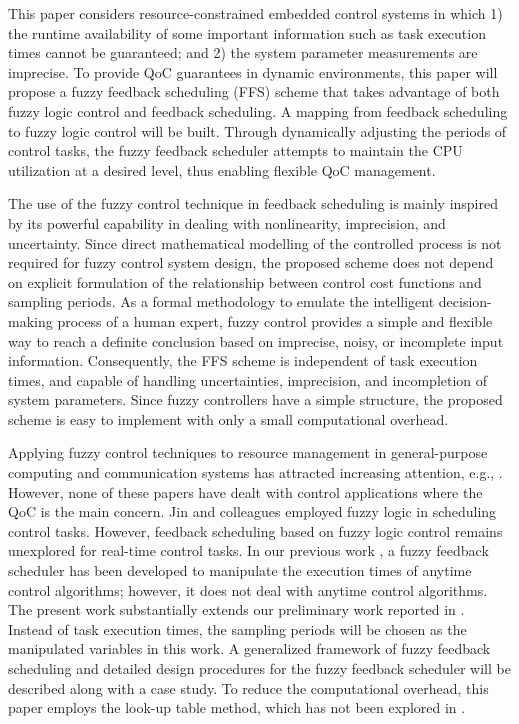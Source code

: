 \documentclass[12pt,a4paper]{ijicic}
\begin{document}
This paper considers resource-constrained embedded control systems
in which 1) the runtime availability of some important information
such as task execution times cannot be guaranteed; and 2) the system
parameter measurements are imprecise. To provide QoC guarantees in
dynamic environments, this paper will propose a fuzzy feedback
scheduling (FFS) scheme that takes advantage of both fuzzy logic
control \cite{R16,R17,R18,R19} and feedback scheduling. A mapping from
feedback scheduling to fuzzy logic control will be built. Through
dynamically adjusting the periods of control tasks, the fuzzy
feedback scheduler attempts to maintain the CPU utilization at a
desired level, thus enabling flexible QoC management.

The use of the fuzzy control technique in feedback scheduling is
mainly inspired by its powerful capability in dealing with
nonlinearity, imprecision, and uncertainty. Since direct mathematical modelling of the
controlled process is not required for fuzzy control system design,
the proposed scheme does not depend on explicit formulation of the
relationship between control cost functions and sampling periods. As
a formal methodology to emulate the intelligent decision-making
process of a human expert, fuzzy control provides a simple and
flexible way to reach a definite conclusion based on imprecise,
noisy, or incomplete input information. Consequently, the FFS scheme
is independent of task execution times, and capable of handling
uncertainties, imprecision, and incompletion of system parameters.
Since fuzzy controllers have a simple structure, the proposed scheme
is easy to implement with only a small computational overhead.

Applying fuzzy control techniques to resource management in
general-purpose computing and communication systems has attracted
increasing attention, e.g., \cite{R10,R20}. However, none of these papers
have dealt with control applications where the QoC is the main
concern. Jin and colleagues \cite{R11} employed fuzzy logic in scheduling
control tasks. However, feedback scheduling based on fuzzy logic
control remains unexplored for real-time control tasks. In our
previous work \cite{R15}, a fuzzy feedback scheduler has been developed to
manipulate the execution times of anytime control algorithms; however, it
does not deal with anytime control algorithms. The present work substantially extends our
preliminary work reported in \cite{R13,R14}. Instead of task
execution times, the sampling periods will be chosen as the manipulated
variables in this work. A generalized framework of
fuzzy feedback scheduling and detailed design procedures for the
fuzzy feedback scheduler will be described along with
a case study. To reduce the computational overhead, this paper
employs the look-up table method, which has not been explored in
\cite{R13,R14}.
\end{document}

